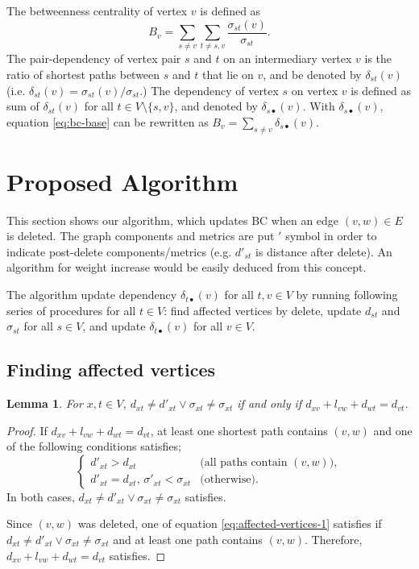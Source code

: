 \documentclass[twocolumn]{article}
\newtheorem{lemma}{Lemma}
\begin{document}
  The betweenness centrality of vertex $v$ is defined as
  \begin{equation}
    B_{v}=\sum_{s\neq v}\sum_{t\neq s,v}\frac{\sigma_{st}(v)}{\sigma_{st}}.
    \label{eq:bc-base}
  \end{equation}
  The pair-dependency of vertex pair $s$ and $t$ on an intermediary vertex $v$ is the ratio of shortest paths between $s$ and $t$ that lie on $v$, and be denoted by $\delta_{st}(v)$ (i.e. $\delta_{st}(v)=\sigma_{st}(v)/\sigma_{st}$.)
  The dependency of vertex $s$ on vertex $v$ is defined as sum of $\delta_{st}(v)$ for all $t\in V\setminus\{s,v\}$, and denoted by $\delta_{s\bullet}(v)$.
  With $\delta_{s\bullet}(v)$, equation \eqref{eq:bc-base} can be rewritten as $B_{v}=\sum_{s\neq v}\delta_{s\bullet}(v)$.

  \section{Proposed Algorithm}
  This section shows our algorithm, which updates BC when an edge $(v,w)\in E$ is deleted.
  The graph components and metrics are put $'$ symbol in order to indicate post-delete components/metrics (e.g. $d'_{st}$ is distance after delete).
  An algorithm for weight increase would be easily deduced from this concept.

  The algorithm update dependency $\delta_{t\bullet}(v)$ for all $t,v\in V$ by running following series of procedures for all $t\in V$: find affected vertices by delete, update $d_{st}$ and $\sigma_{st}$ for all $s\in V$, and update $\delta_{t\bullet}(v)$ for all $v\in V$.

  \subsection*{Finding affected vertices}
  \begin{lemma}
    \label{lm:affected-vertices}
    For $x,t\in V$, $d_{xt}\neq d'_{xt}\lor\sigma_{xt}\neq\sigma_{xt}$ if and only if $d_{xv}+l_{vw}+d_{wt}=d_{vt}$.
  \end{lemma}
  \begin{proof}
    If $d_{xv}+l_{vw}+d_{wt}=d_{vt}$, at least one shortest path contains $(v,w)$ and one of the following conditions satisfies;
    \begin{equation}
      \begin{cases}
        d'_{xt}>d_{xt} & \text{(all paths contain $(v,w)$)},\\
        d'_{xt}=d_{xt},\,\sigma'_{xt}<\sigma_{xt} & \text{(otherwise)}.
      \end{cases}
      \label{eq:affected-vertices-1}
    \end{equation}
    In both cases, $d_{xt}\neq d'_{xt}\lor\sigma_{xt}\neq\sigma_{xt}$ satisfies.

    Since $(v,w)$ was deleted, one of equation \eqref{eq:affected-vertices-1} satisfies if $d_{xt}\neq d'_{xt}\lor\sigma_{xt}\neq\sigma_{xt}$ and at least one path contains $(v,w)$. Therefore, $d_{xv}+l_{vw}+d_{wt}=d_{vt}$ satisfies.
  \end{proof}
\end{document}
